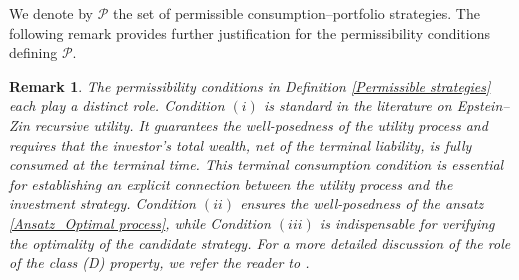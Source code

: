 \documentclass[12,reqno]{amsart}
\numberwithin{equation}{section}
\newtheorem{remark}[defi]{Remark}
\begin{document}
We denote by $\mathcal{P}$ the set of permissible consumption--portfolio strategies. The following remark provides further justification for the permissibility conditions defining $\mathcal{P}$.
\begin{remark}
	The permissibility conditions in Definition \ref{Permissible strategies} each play a distinct role. Condition $(i)$ is standard in the literature on Epstein--Zin recursive utility. It guarantees the well-posedness of the utility process and requires that the investor's total wealth, net of the terminal liability, is fully consumed at the terminal time. This terminal consumption condition is essential for establishing an explicit connection between the utility process and the investment strategy. Condition $(ii)$ ensures the well-posedness of the ansatz \eqref{Ansatz_Optimal process}, while Condition $(iii)$ is indispensable for verifying the optimality of the candidate strategy. For a more detailed discussion of the role of the class (D) property, we refer the reader to \cite[Rmk.~3.6]{aurand2023epstein}.
\end{remark}
\end{document}
